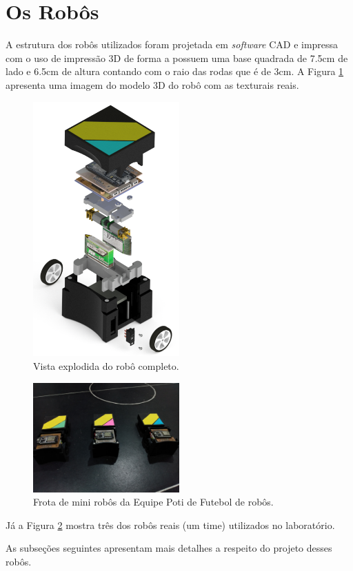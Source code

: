 \section{Os Robôs}
A estrutura dos robôs utilizados foram projetada em \emph{software} CAD e impressa com o uso de impressão 3D de forma a possuem uma base quadrada de 7.5cm de lado e 6.5cm de altura contando com o raio das rodas que é de 3cm. A Figura \ref{fig:robo_completo_explodido} apresenta uma imagem do modelo 3D do robô com as texturais reais.\\

\begin{figure}[H]
    \centering
    \includegraphics[width=0.5\textwidth]{figuras/robo/robo_completo_explodido.png}
    \caption{Vista explodida do robô completo.}
    \label{fig:robo_completo_explodido}
\end{figure}

\begin{figure}[H]
    \centering
    \includegraphics[width=0.5\textwidth]{textuais/robo/robos_capa_aberta.jpg}
    \caption{Frota de mini robôs da Equipe Poti de Futebol de robôs.}
    \label{fig:robos_capa_aberta}
\end{figure}

Já a Figura \ref{fig:robos_capa_aberta} mostra três dos robôs reais (um time) utilizados no laboratório.

As subseções seguintes apresentam mais detalhes a respeito do projeto desses robôs.

